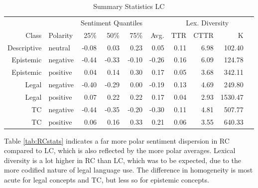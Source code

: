 \documentclass{article}
\begin{document}
\begin{table}[!h]
\centering
{}
\begin{tabular}{rlrrrrrrrr}
  & & \multicolumn{3}{c}{Sentiment Quantiles} & & \multicolumn{3}{c}{Lex. Diversity}\\
   \cmidrule{3-5} \cmidrule{7-9}
  Class & Polarity & 25\% & 50\% & 75\% & Avg. &  TTR & CTTR & K\\
  \bottomrule
Descriptive & neutral & -0.08 & 0.03 & 0.23 & 0.05 & 0.11 & 6.98 & 102.40 \\ 
  Epistemic & negative & -0.44 & -0.33 & -0.10 & -0.26 & 0.16 & 6.09 & 124.78 \\ 
  Epistemic & positive & 0.04 & 0.14 & 0.30 & 0.17 & 0.05 & 3.68 & 342.11 \\ 
  Legal & negative & -0.40 & -0.29 & 0.00 & -0.19 & 0.13 & 4.69 & 249.80 \\ 
  Legal & positive & 0.07 & 0.22 & 0.22 & 0.17 & 0.04 & 2.93 & 1530.47 \\ 
  TC & negative & -0.44 & -0.35 & -0.20 & -0.30 & 0.11 & 4.81 & 507.77 \\ 
  TC & positive & 0.06 & 0.16 & 0.33 & 0.21 & 0.06 & 3.55 & 640.33 \\ 
   \hline
\end{tabular}
\caption{Summary Statistics LC}
\label{tab:LCstats}
\end{table}

Table \ref{tab:RCstats} indicates a far more polar sentiment dispersion in RC compared to LC, which is also reflected by the more polar averages. Lexical diversity is a lot higher in RC than LC, which was to be expected, due to the more codified nature of legal language use. The difference in homogeneity is most acute for legal concepts and TC, but less so for epistemic concepts.
\end{document}
